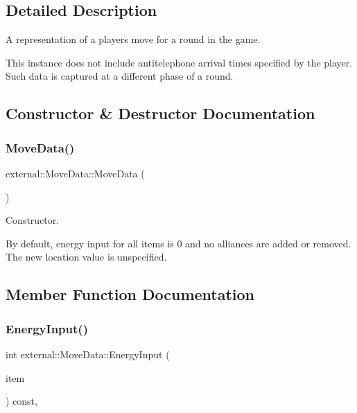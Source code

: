 \subsection{Detailed Description}
A representation of a player\textquotesingle{}s move for a round in the game. 

This instance does not include antitelephone arrival times specified by the player. Such data is captured at a different phase of a round. 

\subsection{Constructor \& Destructor Documentation}
\mbox{\label{classexternal_1_1_move_data_a230c2389b03633b6b02928a867f59f27}} 
\subsubsection{\texorpdfstring{Move\+Data()}{MoveData()}}
{\footnotesize\ttfamily external\+::\+Move\+Data\+::\+Move\+Data (\begin{DoxyParamCaption}{ }\end{DoxyParamCaption})\hspace{0.3cm}{\ttfamily [inline]}}



Constructor. 

By default, energy input for all items is 0 and no alliances are added or removed. The new location value is unspecified. 

\subsection{Member Function Documentation}
\mbox{\label{classexternal_1_1_move_data_acaef1f55196d7bb2fba3ebba2e9e9428}} 
\subsubsection{\texorpdfstring{Energy\+Input()}{EnergyInput()}}
{\footnotesize\ttfamily int external\+::\+Move\+Data\+::\+Energy\+Input (\begin{DoxyParamCaption}\item[{Item\+Type}]{item }\end{DoxyParamCaption}) const\hspace{0.3cm}{\ttfamily [inline]}, {\ttfamily [noexcept]}}



